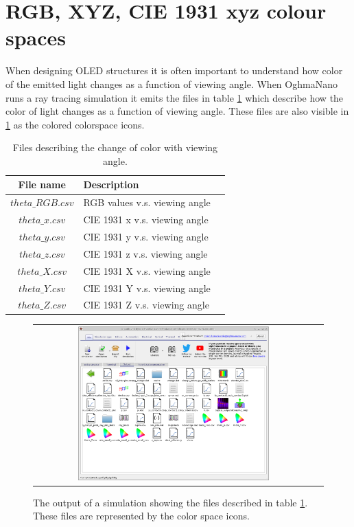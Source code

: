 \section{RGB, XYZ, CIE 1931 xyz colour spaces}
When designing OLED structures it is often important to understand how color of the emitted light changes as a function of viewing angle. When OghmaNano runs a ray tracing simulation it emits the files in table \ref{tab:oled_output1} which describe how the color of light changes as a function of viewing angle. These files are also visible in \ref{fig:oled7} as the colored colorspace icons.

\begin{table}[H]
\begin{center}
\begin{tabular}{ |c|l|c| } 
 \hline
	File name 			& 	Description  \\ 
 \hline
	$theta\_RGB.csv$			&	RGB values v.s. viewing angle \\ 
	$theta\_x.csv$			&	CIE 1931 x v.s. viewing angle \\ 
	$theta\_y.csv$			&	CIE 1931 y v.s. viewing angle \\ 
	$theta\_z.csv$			&	CIE 1931 z v.s. viewing angle \\
	$theta\_X.csv$			&	CIE 1931 X v.s. viewing angle \\ 
	$theta\_Y.csv$			&	CIE 1931 Y v.s. viewing angle \\ 
	$theta\_Z.csv$			&	CIE 1931 Z v.s. viewing angle \\ 
 \hline
\end{tabular}
\caption{Files describing the change of color with viewing angle.}
\label{tab:oled_output1}
\end{center}
\end{table}

\begin{figure}[H]
\centering
\begin{tabular}{ c c }

\includegraphics[width=0.7\textwidth,height=0.6\textwidth]{./images/oled/colors.png}

\\
\end{tabular}
\caption{The output of a simulation showing the files described in table \ref{tab:oled_output1}. These files are represented by the color space icons.}
\label{fig:oled7}
\end{figure}

